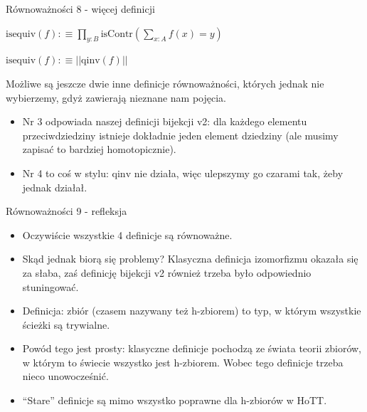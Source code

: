 \documentclass{beamer}
\newcommand{\qinv}{\text{qinv}}
\newcommand{\isequiv}{\text{isequiv}}
\begin{document}
\begin{frame}{Równoważności 8 - więcej definicji}

\begin{definition}[Równoważność 3]
$
\displaystyle
	\isequiv(f) :\equiv
		\prod_{y : B} \text{isContr}\left(\sum_{x : A} f(x) = y\right)
$
\end{definition}


\begin{definition}[Równoważność 4]
$
\displaystyle
	\isequiv(f) :\equiv ||\qinv(f)||
$
\end{definition}

Możliwe są jeszcze dwie inne definicje równoważności, których jednak nie wybierzemy, gdyż zawierają nieznane nam pojęcia.

\begin{itemize}
	\item Nr 3 odpowiada naszej definicji bijekcji v2: dla każdego elementu przeciwdziedziny istnieje dokładnie jeden element dziedziny (ale musimy zapisać to bardziej homotopicznie).
	\item Nr 4 to coś w stylu: $\qinv$ nie działa, więc ulepszymy go czarami tak, żeby jednak działał.
\end{itemize}

\end{frame}

\begin{frame}{Równoważności 9 - refleksja}
\begin{itemize}
	\item Oczywiście wszystkie 4 definicje są równoważne.
	\item Skąd jednak biorą się problemy? Klasyczna definicja izomorfizmu okazała się za słaba, zaś definicję bijekcji v2 również trzeba było odpowiednio stuningować.
	\item Definicja: zbiór (czasem nazywany też h-zbiorem) to typ, w którym wszystkie ścieżki są trywialne.
	\item Powód tego jest prosty: klasyczne definicje pochodzą ze świata teorii zbiorów, w którym to świecie wszystko jest h-zbiorem. Wobec tego definicje trzeba nieco unowocześnić.
	\item ``Stare'' definicje są mimo wszystko poprawne dla h-zbiorów w HoTT.
\end{itemize}
\end{frame}
\end{document}
